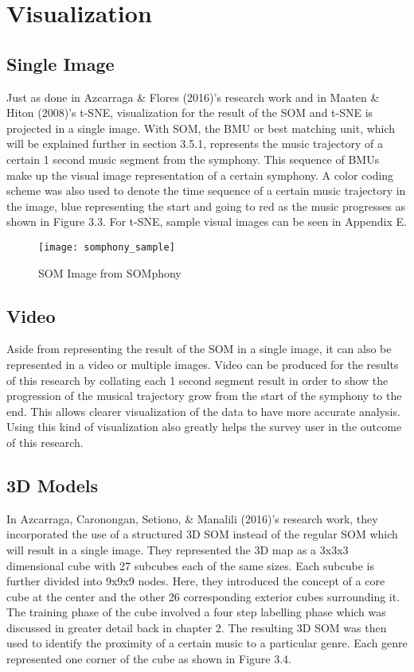 \section{Visualization}
\subsection{Single Image}

Just as done in Azcarraga \& Flores (2016)'s research work and in Maaten \& Hiton (2008)'s t-SNE, visualization for the result of the SOM and t-SNE is projected in a single image. With SOM, the BMU or best matching unit, which will be explained further in section 3.5.1, represents the music trajectory of a certain 1 second music segment from the symphony. This sequence of BMUs make up the visual image representation of a certain symphony. A color coding scheme was also used to denote the time sequence of a certain music trajectory in the image, blue representing the start and going to red as the music progresses as shown in Figure 3.3. For t-SNE, sample visual images can be seen in Appendix E.

\begin{figure}[h]
\caption{SOM Image from SOMphony}
\centering
\texttt{[image: somphony\_sample]}
\end{figure}

\subsection{Video}
Aside from representing the result of the SOM in a single image, it can also be represented in a video or multiple images. Video can be produced for the results of this research by collating  each 1 second segment result in order to show the progression of the musical trajectory grow from the start of the symphony to the end. This allows clearer visualization of the data to have more accurate analysis. Using this kind of visualization also greatly helps the survey user in the outcome of this research.

\subsection{3D Models}

In Azcarraga, Caronongan,  Setiono, \& Manalili (2016)’s research work, they incorporated the use of a structured 3D SOM instead of the regular SOM which will result in a single image. They represented the 3D map as a 3x3x3 dimensional cube with 27 subcubes each of the same sizes. Each subcube is further divided into 9x9x9 nodes. Here, they introduced the concept of a core cube at the center and the other 26 corresponding exterior cubes surrounding it. The training phase of the cube involved a four step labelling phase which was discussed in greater detail back in chapter 2. The resulting 3D SOM was then used to identify the proximity of a certain music to a particular genre. Each genre represented one corner of the cube as shown in Figure 3.4.

